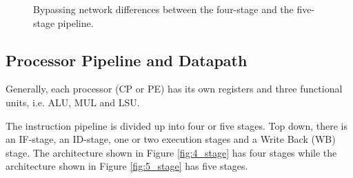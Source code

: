 \begin{figure}[t]
\centering
{}
\hfil
{}
\caption{Bypassing network differences between the four-stage and the five-stage pipeline.}
\label{fig:datapath_pipeline_conf}
\end{figure}

\subsection{Processor Pipeline and Datapath}\label{sec:processor}

Generally, each processor (CP or PE) has its own registers and three functional units, i.e. ALU, MUL and LSU. 

The instruction pipeline is divided up into four or five stages. Top down, there is an IF-stage, an ID-stage, one or two execution stages and a Write Back (WB) stage. The architecture shown in Figure \ref{fig:4_stage} has four stages while the architecture shown in Figure \ref{fig:5_stage} has five stages.\\

